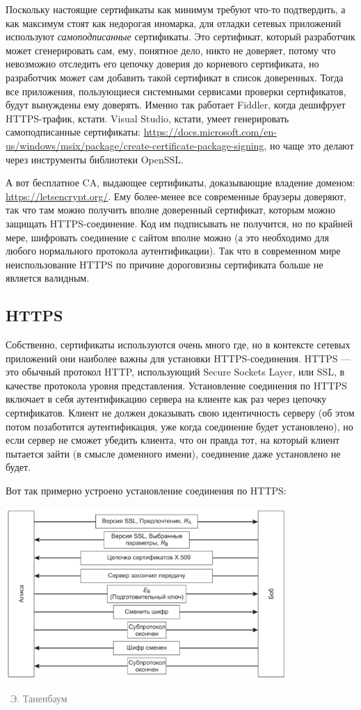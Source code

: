 \documentclass[a5paper]{article}
\newcommand{\attribution}[1] {
\vspace{-5mm}\begin{flushright}\begin{scriptsize}\textcolor{gray}{\textcopyright\, #1}\end{scriptsize}\end{flushright}
}
\begin{document}
Поскольку настоящие сертификаты как минимум требуют что-то подтвердить, а как максимум стоят как недорогая иномарка, для отладки сетевых приложений используют \textit{самоподписанные} сертификаты. Это сертификат, который разработчик может сгенерировать сам, ему, понятное дело, никто не доверяет, потому что невозможно отследить его цепочку доверия до корневого сертификата, но разработчик может сам добавить такой сертификат в список доверенных. Тогда все приложения, пользующиеся системными сервисами проверки сертификатов, будут вынуждены ему доверять. Именно так работает Fiddler, когда дешифрует HTTPS-трафик, кстати. Visual Studio, кстати, умеет генерировать самоподписанные сертификаты: \url{https://docs.microsoft.com/en-us/windows/msix/package/create-certificate-package-signing}, но чаще это делают через инструменты библиотеки OpenSSL. 

А вот бесплатное CA, выдающее сертификаты, доказывающие владение доменом: \url{https://letsencrypt.org/}. Ему более-менее все современные браузеры доверяют, так что там можно получить вполне доверенный сертификат, которым можно защищать HTTPS-соединение. Код им подписывать не получится, но по крайней мере, шифровать соединение с сайтом вполне можно (а это необходимо для любого нормального протокола аутентификации). Так что в современном мире неиспользование HTTPS по причине дороговизны сертификата больше не является валидным.

\subsection{HTTPS}

Собственно, сертификаты используются очень много где, но в контексте сетевых приложений они наиболее важны для установки HTTPS-соединения. HTTPS --- это обычный протокол HTTP, использующий Secure Sockets Layer, или SSL, в качестве протокола уровня представления. Установление соединения по HTTPS включает в себя аутентификацию сервера на клиенте как раз через цепочку сертификатов. Клиент не должен доказывать свою идентичность серверу (об этом потом позаботится аутентификация, уже когда соединение будет установлено), но если сервер не сможет убедить клиента, что он правда тот, на который клиент пытается зайти (в смысле доменного имени), соединение даже установлено не будет.

Вот так примерно устроено установление соединения по HTTPS:

\begin{center}
    \includegraphics[width=0.8\textwidth]{ssl.png}
    \attribution{Э. Таненбаум}
\end{center}
\end{document}
